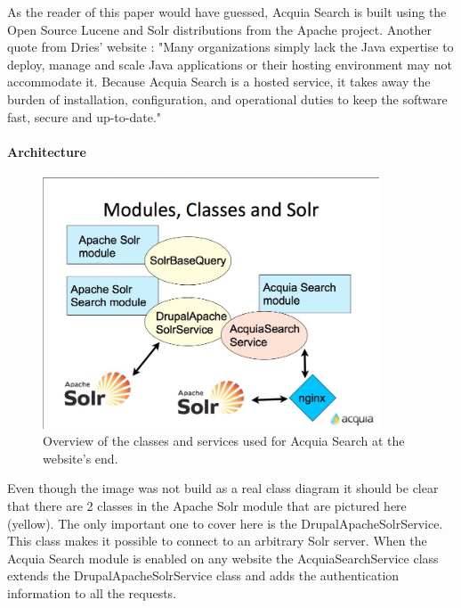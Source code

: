 As the reader of this paper would have guessed, Acquia Search is built using the Open Source Lucene and Solr distributions from the Apache project. Another quote from Dries' website : "Many organizations simply lack the Java expertise to deploy, manage and scale Java applications or their hosting environment may not accommodate it. Because Acquia Search is a hosted service, it takes away the burden of installation, configuration, and operational duties to keep the software fast, secure and up-to-date."

\paragraph{Architecture}
\begin{figure}[H]
     \includegraphics[width=10cm]{images/acquia_solr_classes.jpg}
     \caption{Overview of the classes and services used for Acquia Search at the website's end.}
\end{figure}

Even though the image was not build as a real class diagram it should be clear that there are 2 classes in the Apache Solr module that are pictured here (yellow). The only important one to cover here is the DrupalApacheSolrService. This class makes it possible to connect to an arbitrary Solr server. When the Acquia Search module is enabled on any website the AcquiaSearchService class extends the DrupalApacheSolrService class and adds the authentication information to all the requests.

